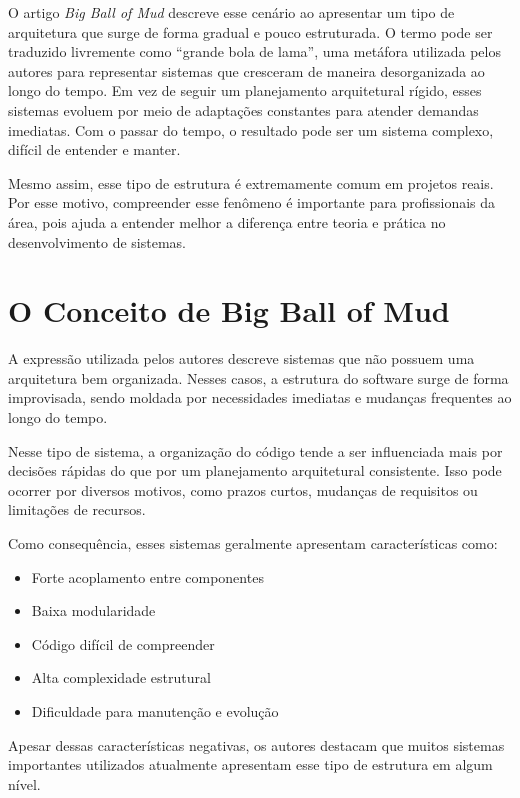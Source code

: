 \documentclass[conference]{IEEEtran}
\begin{document}
O artigo \textit{Big Ball of Mud} descreve esse cenário ao apresentar um tipo de arquitetura que surge de forma gradual e pouco estruturada. O termo pode ser traduzido livremente como ``grande bola de lama'', uma metáfora utilizada pelos autores para representar sistemas que cresceram de maneira desorganizada ao longo do tempo. Em vez de seguir um planejamento arquitetural rígido, esses sistemas evoluem por meio de adaptações constantes para atender demandas imediatas. Com o passar do tempo, o resultado pode ser um sistema complexo, difícil de entender e manter.

Mesmo assim, esse tipo de estrutura é extremamente comum em projetos reais. Por esse motivo, compreender esse fenômeno é importante para profissionais da área, pois ajuda a entender melhor a diferença entre teoria e prática no desenvolvimento de sistemas.

\section{O Conceito de Big Ball of Mud}

A expressão utilizada pelos autores descreve sistemas que não possuem uma arquitetura bem organizada. Nesses casos, a estrutura do software surge de forma improvisada, sendo moldada por necessidades imediatas e mudanças frequentes ao longo do tempo.

Nesse tipo de sistema, a organização do código tende a ser influenciada mais por decisões rápidas do que por um planejamento arquitetural consistente. Isso pode ocorrer por diversos motivos, como prazos curtos, mudanças de requisitos ou limitações de recursos.

Como consequência, esses sistemas geralmente apresentam características como:

\begin{itemize}
\item Forte acoplamento entre componentes
\item Baixa modularidade
\item Código difícil de compreender
\item Alta complexidade estrutural
\item Dificuldade para manutenção e evolução
\end{itemize}

Apesar dessas características negativas, os autores destacam que muitos sistemas importantes utilizados atualmente apresentam esse tipo de estrutura em algum nível.
\end{document}
